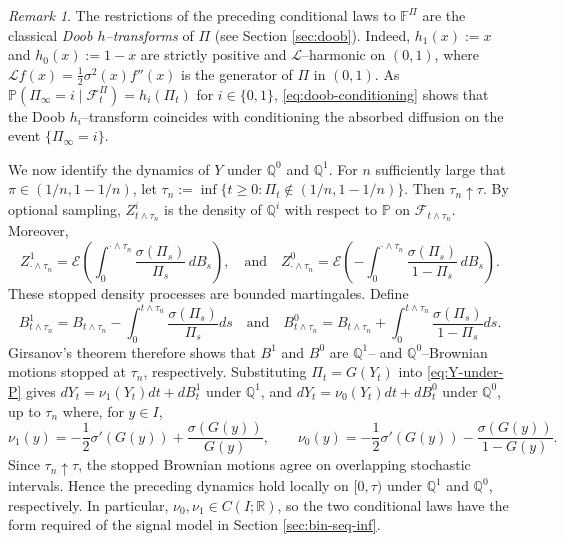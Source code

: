 \documentclass[11pt, reqno]{amsart}
\theoremstyle{plain}
\theoremstyle{remark}
\newtheorem{remark}[theorem]{Remark}
\numberwithin{equation}{section}
\begin{document}
\begin{remark}\label{rmk:doob_h_embedding}
The restrictions of the preceding conditional laws to $\mathbb F^\Pi$ are the classical \emph{Doob $h$--transforms} of $\Pi$ (see Section \ref{sec:doob}). Indeed, $h_1(x):=x$ and $h_0(x):=1-x$ are strictly positive and $\mathcal L$--harmonic on
$(0,1)$, where $\mathcal Lf(x)=\frac12\sigma^2(x)f''(x)$ is the generator of $\Pi$ in $(0,1)$. As $\mathbb P(\Pi_\infty=i\mid\mathcal F_t^\Pi) =
  h_i(\Pi_t)$ for $i\in\{0,1\}$, \eqref{eq:doob-conditioning} shows that the Doob $h_i$--transform coincides with conditioning the absorbed diffusion on the event $\{\Pi_\infty=i\}$.
%
%
%
\end{remark}


We now identify the dynamics of $Y$ under $\mathbb{Q}^0$ and $\mathbb{Q}^1$. For $n$ sufficiently large that
$\pi\in(1/n,1-1/n)$, let $\tau_n
  :=
  \inf\{t\geq0:\Pi_t\notin(1/n,1-1/n)\}$.
Then $\tau_n\uparrow\tau$. By optional sampling,
$Z^i_{t\wedge\tau_n}$ is the density of $\mathbb Q^i$ with respect to
$\mathbb P$ on $\mathcal F_{t\wedge\tau_n}$. Moreover,
\[
  Z^1_{\cdot\wedge\tau_n}
  =
  \mathcal E\left(
    \int_0^{\cdot\wedge\tau_n}
    \frac{\sigma(\Pi_s)}{\Pi_s}\,dB_s
  \right), \quad \text{and} \quad
  Z^0_{\cdot\wedge\tau_n}
  =
  \mathcal E\left(
    -\int_0^{\cdot\wedge\tau_n}
    \frac{\sigma(\Pi_s)}{1-\Pi_s}\,dB_s
  \right).
\]
These stopped density processes are bounded martingales. Define
\[
  B^1_{t\wedge\tau_n}=B_{t\wedge\tau_n}-\int_0^{t\wedge\tau_n}\frac{\sigma(\Pi_s)}{\Pi_s}ds \quad \text{and} \quad B^0_{t\wedge\tau_n}=B_{t\wedge\tau_n}+\int_0^{t\wedge\tau_n}\frac{\sigma(\Pi_s)}{1-\Pi_s}ds.
\]
Girsanov's theorem therefore shows that $B^1$ and $B^0$ are $\mathbb{Q}^1$-- and $\mathbb{Q}^0$--Brownian motions stopped at $\tau_n$, respectively. Substituting $\Pi_t=G(Y_t)$ into \eqref{eq:Y-under-P} gives $dY_t=\nu_1(Y_t)dt+dB^1_t$ under $\mathbb{Q}^1$, and $dY_t=\nu_0(Y_t)dt+dB^0_t$ under $\mathbb{Q}^0$,
up to $\tau_n$ where, for $y\in I$,
\begin{equation}\label{eq:embedding-drifts}
  \nu_1(y)=-\frac12\sigma'(G(y))+\frac{\sigma(G(y))}{G(y)},
  \qquad
  \nu_0(y)=-\frac12\sigma'(G(y))-\frac{\sigma(G(y))}{1-G(y)}.
\end{equation}
Since $\tau_n\uparrow\tau$, the stopped Brownian motions agree on
overlapping stochastic intervals. Hence the
preceding dynamics hold locally on $[0,\tau)$ under
$\mathbb Q^1$ and $\mathbb Q^0$, respectively. In particular,
$\nu_0,\nu_1\in C(I;\mathbb R)$, so the two conditional laws have the
form required of the signal model in
Section \ref{sec:bin-seq-inf}.
\end{document}
